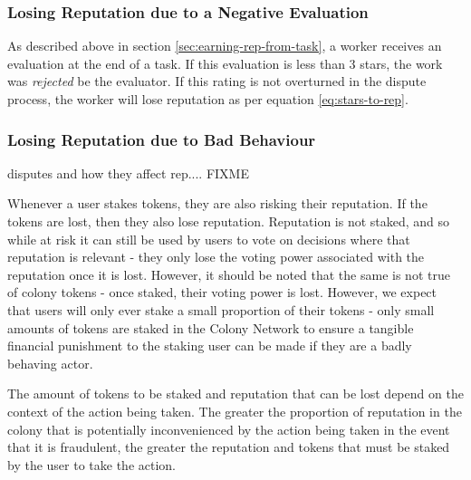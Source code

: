 \subsubsection{Losing Reputation due to a Negative Evaluation}
As described above in section \ref{sec:earning-rep-from-task}, a worker receives an evaluation at the end of a task. If this evaluation is less than 3 stars, the work was \emph{rejected} be the evaluator. If this rating is not overturned in the dispute process, the worker will lose reputation as per equation \eqref{eq:stars-to-rep}.


\subsubsection{Losing Reputation due to Bad Behaviour}
disputes and how they affect rep.... FIXME


Whenever a user stakes tokens, they are also risking their reputation. If the tokens are lost, then they also lose reputation. Reputation is not staked, and so while at risk it can still be used by users to vote on decisions where that reputation is relevant - they only lose the voting power associated with the reputation once it is lost. However, it should be noted that the same is not true of colony tokens - once staked, their voting power is lost. However, we expect that users will only ever stake a small proportion of their tokens - only small amounts of tokens are staked in the Colony Network to ensure a tangible financial punishment to the staking user can be made if they are a badly behaving actor.

The amount of tokens to be staked and reputation that can be lost depend on the context of the action being taken. The greater the proportion of reputation in the colony that is potentially inconvenienced by the action being taken in the event that it is fraudulent, the greater the reputation and tokens that must be staked by the user to take the action.




